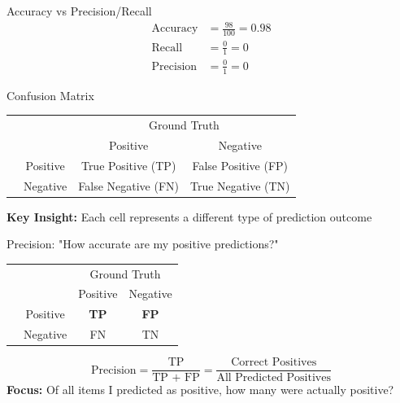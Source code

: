 \documentclass[usenames,dvipsnames]{beamer}
\begin{document}
\begin{frame}{Accuracy vs Precision/Recall}
\begin{align*}
\text{Accuracy} &= \frac{98}{100} = 0.98 \\
\text{Recall} &= \frac{0}{1} = 0 \\
\text{Precision} &= \frac{0}{1} = 0
\end{align*}

\end{frame}

\begin{frame}{Confusion Matrix}
\vspace{40pt}
\begin{center}
\begin{tabular}{@{}cc cc@{}}
	\multicolumn{1}{c}{} &\multicolumn{1}{c}{} &\multicolumn{2}{c}{Ground Truth} \\ 
	\cmidrule(lr){3-4}
	\multicolumn{1}{c}{} & 
	\multicolumn{1}{c}{} & 
	\multicolumn{1}{c}{Positive} & 
	\multicolumn{1}{c}{Negative} \\ 
	\cline{2-4}
	\multirow[c]{2}{*}{\rotatebox[origin=tr]{90}{Predicted}}
	& Positive  & \cellcolor{blue!20}True Positive (TP) & \cellcolor{red!20}False Positive (FP)   \\[1.5ex]
	& Negative  & \cellcolor{red!20}False Negative (FN)   & \cellcolor{green!20}True Negative (TN) \\ 
	\cline{2-4}
\end{tabular}
\end{center}
\vspace{20pt}
\pause
\textbf{Key Insight:} Each cell represents a different type of prediction outcome
\end{frame}

\begin{frame}{Precision: "How accurate are my positive predictions?"}
\vspace{20pt}
\begin{center}
\begin{tabular}{@{}cc cc@{}}
	\multicolumn{1}{c}{} &\multicolumn{1}{c}{} &\multicolumn{2}{c}{Ground Truth} \\ 
	\cmidrule(lr){3-4}
	\multicolumn{1}{c}{} & 
	\multicolumn{1}{c}{} & 
	\multicolumn{1}{c}{Positive} & 
	\multicolumn{1}{c}{Negative} \\ 
	\cline{2-4}
	\multirow[c]{2}{*}{\rotatebox[origin=tr]{90}{Predicted}}
	& Positive  & \cellcolor{blue!40}\textbf{TP} & \cellcolor{blue!40}\textbf{FP}   \\[1.5ex]
	& Negative  & \cellcolor{gray!10}FN   & \cellcolor{gray!10}TN \\ 
	\cline{2-4}
\end{tabular}
\end{center}
\vspace{20pt}
$$\text{Precision} = \frac{\text{TP}}{\text{TP + FP}} = \frac{\text{Correct Positives}}{\text{All Predicted Positives}}$$
\pause
\textbf{Focus:} Of all items I predicted as positive, how many were actually positive?
\end{frame}
\end{document}

